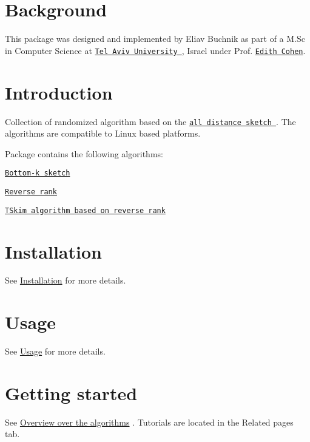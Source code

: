 \hypertarget{index_Background}{}\section{Background}\label{index_Background}
This package was designed and implemented by Eliav Buchnik as part of a M.\+Sc in Computer Science at \href{https://english.tau.ac.il/}{\tt Tel Aviv University }, Israel under Prof. \href{http://www.cohenwang.com/edith/}{\tt Edith Cohen}.\hypertarget{index_intro_sec}{}\section{Introduction}\label{index_intro_sec}
Collection of randomized algorithm based on the \href{http://arxiv.org/abs/1306.3284}{\tt all distance sketch }. The algorithms are compatible to Linux based platforms.

Package contains the following algorithms\+:
\begin{DoxyEnumerate}
\item \href{http://arxiv.org/abs/1306.3284}{\tt Bottom-\/k sketch}
\item \href{http://arxiv.org/abs/1506.02386}{\tt Reverse rank}
\item \href{http://arxiv.org/pdf/1506.02386}{\tt T\+Skim algorithm based on reverse rank}
\end{DoxyEnumerate}\hypertarget{index_Installation}{}\section{Installation}\label{index_Installation}
See \hyperlink{Install}{Installation} for more details.\hypertarget{index_Usage}{}\section{Usage}\label{index_Usage}
See \hyperlink{usage}{Usage} for more details.\hypertarget{index_start}{}\section{Getting started}\label{index_start}
See \hyperlink{Overview}{Overview over the algorithms} . Tutorials are located in the Related pages tab. 